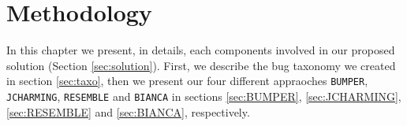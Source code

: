 
\chapter{Methodology\label{chap:methodology}}

In this chapter we present, in details, each components involved in our proposed solution (Section \ref{sec:solution}). First, we describe the bug taxonomy we created in section \ref{sec:taxo}, then we present our four different appraoches {\tt BUMPER}, {\tt JCHARMING}, {\tt RESEMBLE} and {\tt BIANCA} in sections \ref{sec:BUMPER}, \ref{sec:JCHARMING}, \ref{sec:RESEMBLE} and \ref{sec:BIANCA}, respectively.






